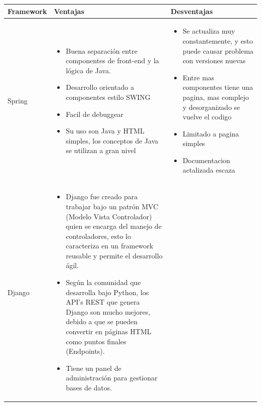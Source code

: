 \documentclass[a4paper,12 pt]{article}
\begin{document}
\begin{table}[H]
    \centering
    \small{
    \begin{tabular}{|M{2.5cm}|M{6.5cm}|M{6.5cm}|}
        \hline
        \textbf{Framework}  &\textbf{Ventajas}   &\textbf{Desventajas}\\
        \hline 
            Spring   & 
            \begin{itemize}
                \item Buena separación entre componentes de front-end y la
                lógica de Java.
                \item Desarrollo orientado a componentes estilo SWING
                \item Facil de debuggear
                \item Su uso son Java y HTML simples, los conceptos de Java se
                utilizan a gran nivel
            \end{itemize}   & 
            \begin{itemize}
                \item Se actualiza muy constantemente, y esto puede causar
                problema con versiones nuevas
                \item Entre mas componentes tiene una pagina, mas complejo y
                desorganizado se vuelve el codigo
                \item Limitado a pagina simples
                \item Documentacion actalizada escaza
            \end{itemize}
            \\
        \hline
            Django & 
            \begin{itemize}
                \item Django fue creado para trabajar bajo un patrón MVC (Modelo
                Vista Controlador) quien se encarga del manejo de controladores,
                esto lo caracteriza en un framework reusable y permite el
                desarrollo ágil.
                \item Según la comunidad que desarrolla bajo Python, los API’s
                REST que genera Django son mucho mejores, debido a que se pueden
                convertir en páginas HTML como puntos finales (Endpoints).
                \item Tiene un panel de administración para gestionar bases de
                datos.
            \end{itemize}   &
            \begin{itemize}

\end{itemize}
\end{tabular}}
\end{table}
\end{document}
